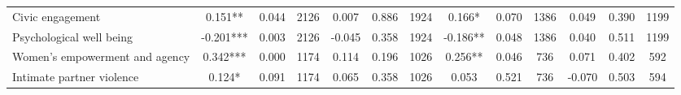\begin{tabular}{l*{12}{c}}
 Civic engagement &        0.151** &        0.044 & 2126    &        0.007 &        0.886 & 1924    &        0.166* &        0.070 & 1386 &        0.049 &        0.390 & 1199 \\ 

 Psychological well being &       -0.201*** &        0.003 & 2126    &       -0.045 &        0.358 & 1924    &       -0.186** &        0.048 & 1386 &        0.040 &        0.511 & 1199 \\ 

 Women's empowerment and agency &        0.342*** &        0.000 & 1174    &        0.114 &        0.196 & 1026    &        0.256** &        0.046 & 736 &        0.071 &        0.402 & 592 \\ 

 Intimate partner violence &        0.124* &        0.091 & 1174    &        0.065 &        0.358 & 1026    &        0.053 &        0.521 & 736 &       -0.070 &        0.503 & 594 \\ 

\hline \end{tabular}

